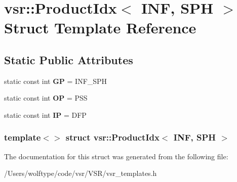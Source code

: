 \hypertarget{structvsr_1_1_product_idx_3_01_i_n_f_00_01_s_p_h_01_4}{\section{vsr\-:\-:Product\-Idx$<$ I\-N\-F, S\-P\-H $>$ Struct Template Reference}
\label{structvsr_1_1_product_idx_3_01_i_n_f_00_01_s_p_h_01_4}
}
\subsection*{Static Public Attributes}
\begin{DoxyCompactItemize}
\item 
\hypertarget{structvsr_1_1_product_idx_3_01_i_n_f_00_01_s_p_h_01_4_adba3d78f3570eaa0981fe0073a94c1ed}{static const int {\bfseries G\-P} = I\-N\-F\-\_\-\-S\-P\-H}\label{structvsr_1_1_product_idx_3_01_i_n_f_00_01_s_p_h_01_4_adba3d78f3570eaa0981fe0073a94c1ed}

\item 
\hypertarget{structvsr_1_1_product_idx_3_01_i_n_f_00_01_s_p_h_01_4_af93f668a2d06d2b9586e4386063bfcbe}{static const int {\bfseries O\-P} = P\-S\-S}\label{structvsr_1_1_product_idx_3_01_i_n_f_00_01_s_p_h_01_4_af93f668a2d06d2b9586e4386063bfcbe}

\item 
\hypertarget{structvsr_1_1_product_idx_3_01_i_n_f_00_01_s_p_h_01_4_a2a105b6671d30e7c7bb94df1064e4784}{static const int {\bfseries I\-P} = D\-F\-P}\label{structvsr_1_1_product_idx_3_01_i_n_f_00_01_s_p_h_01_4_a2a105b6671d30e7c7bb94df1064e4784}

\end{DoxyCompactItemize}
\subsubsection*{template$<$$>$ struct vsr\-::\-Product\-Idx$<$ I\-N\-F, S\-P\-H $>$}



The documentation for this struct was generated from the following file\-:\begin{DoxyCompactItemize}
\item 
/\-Users/wolftype/code/vsr/\-V\-S\-R/vsr\-\_\-templates.\-h\end{DoxyCompactItemize}
